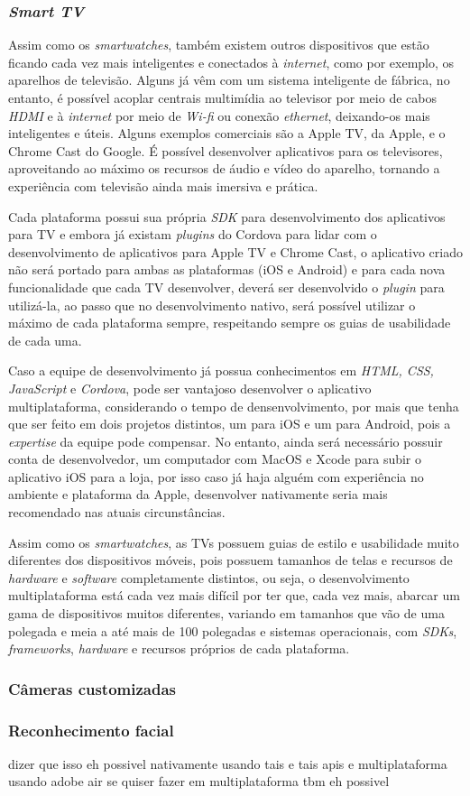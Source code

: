 \subsubsection{\textit{Smart TV}} \label{subsubsec:tv}
Assim como os \textit{smartwatches}, também existem outros dispositivos que estão ficando cada vez mais inteligentes e conectados à \textit{internet}, como por exemplo, os aparelhos de televisão. Alguns já vêm
com um sistema inteligente de fábrica, no entanto, é possível acoplar centrais multimídia ao televisor por meio de cabos \textit{HDMI} e à \textit{internet} por meio de \textit{Wi-fi} ou conexão \textit{ethernet}, 
deixando-os mais inteligentes e úteis. Alguns exemplos comerciais são a Apple TV, da Apple, e o Chrome Cast do Google. É possível desenvolver aplicativos para os televisores, aproveitando ao máximo os recursos de 
áudio e vídeo do aparelho, tornando a experiência com televisão ainda mais imersiva e prática. 

Cada plataforma possui sua própria \textit{SDK} para desenvolvimento dos aplicativos para TV e embora já existam \textit{plugins} do Cordova para lidar com o desenvolvimento de aplicativos para Apple TV e Chrome Cast, o aplicativo criado não será portado para ambas as plataformas (iOS e Android) e para cada nova funcionalidade que cada TV desenvolver, deverá ser desenvolvido o \textit{plugin} para utilizá-la, ao passo que 
no desenvolvimento nativo, será possível utilizar o máximo de cada plataforma sempre, respeitando sempre os guias de usabilidade de cada uma. 

Caso a equipe de desenvolvimento já possua conhecimentos em \textit{HTML, CSS, JavaScript} e \textit{Cordova}, pode ser vantajoso desenvolver o aplicativo multiplataforma, considerando o tempo de densenvolvimento, por 
mais que tenha que ser feito em dois projetos distintos, um para iOS e um para Android, pois a \textit{expertise} da equipe pode compensar. No entanto, ainda será necessário possuir conta de desenvolvedor, um computador com 
MacOS e Xcode para subir o aplicativo iOS para a loja, por isso caso já haja alguém com experiência no ambiente e plataforma da Apple, desenvolver nativamente seria mais recomendado nas atuais circunstâncias. 

Assim como os \textit{smartwatches}, as TVs possuem guias de estilo e usabilidade muito diferentes dos dispositivos móveis, pois possuem tamanhos de telas e recursos de \textit{hardware} e \textit{software} completamente 
distintos, ou seja, o desenvolvimento multiplataforma está cada vez mais difícil por ter que, cada vez mais, abarcar um gama de dispositivos muitos diferentes, variando em tamanhos que vão de uma polegada e meia a
até mais de 100 polegadas e sistemas operacionais, com \textit{SDKs}, \textit{frameworks}, \textit{hardware} e recursos próprios de cada plataforma. 

\subsubsection{Câmeras customizadas} \label{subsubsec:customcamera}

\subsubsection{Reconhecimento facial} \label{subsubsec:facial}
dizer que isso eh possivel nativamente usando tais e tais apis e multiplataforma usando adobe air 
se quiser fazer em multiplataforma tbm eh possivel